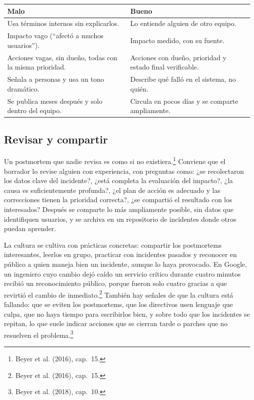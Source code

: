 \documentclass[variant=apuntes,cover=institutional,mode=screen]{ua-engineering-v6-article}
\begin{document}
\begin{center}
\begin{tabular}{p{}p{}}
\toprule
\textbf{Malo} & \textbf{Bueno} \\
\midrule
Usa términos internos sin explicarlos. & Lo entiende alguien de otro equipo. \\
Impacto vago (``afectó a muchos usuarios''). & Impacto medido, con su fuente. \\
Acciones vagas, sin dueño, todas con la misma prioridad. & Acciones con dueño, prioridad y estado final verificable. \\
Señala a personas y usa un tono dramático. & Describe qué falló en el sistema, no quién. \\
Se publica meses después y solo dentro del equipo. & Circula en pocos días y se comparte ampliamente. \\
\bottomrule
\end{tabular}
\end{center}

\subsection{Revisar y compartir}

Un postmortem que nadie revisa es como si no existiera.\footnote{Beyer et al. (2016), cap.~15.} Conviene que el borrador lo revise alguien con experiencia, con preguntas como: ¿se recolectaron los datos clave del incidente?, ¿está completa la evaluación del impacto?, ¿la causa es suficientemente profunda?, ¿el plan de acción es adecuado y las correcciones tienen la prioridad correcta?, ¿se compartió el resultado con los interesados? Después se comparte lo más ampliamente posible, sin datos que identifiquen usuarios, y se archiva en un repositorio de incidentes donde otros puedan aprender.

La cultura se cultiva con prácticas concretas: compartir los postmortems interesantes, leerlos en grupo, practicar con incidentes pasados y reconocer en público a quien maneja bien un incidente, aunque lo haya provocado. En Google, un ingeniero cuyo cambio dejó caído un servicio crítico durante cuatro minutos recibió un reconocimiento público, porque fueron solo cuatro gracias a que revirtió el cambio de inmediato.\footnote{Beyer et al. (2016), cap.~15.} También hay señales de que la cultura está fallando: que se eviten los postmortems, que los directivos usen lenguaje que culpa, que no haya tiempo para escribirlos bien, y sobre todo que los incidentes se repitan, lo que suele indicar acciones que se cierran tarde o parches que no resuelven el problema.\footnote{Beyer et al. (2018), cap.~10.}
\end{document}
